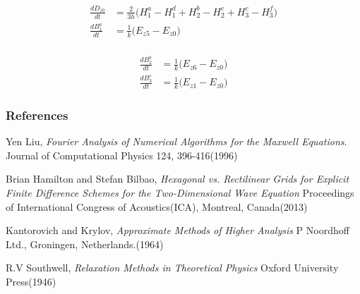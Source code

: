 \documentclass{beamer}
\begin{document}
\begin{frame}
\begin{minipage}{.5\textwidth}
  \centering
\begin{align*}
\frac{d D_{z0}}{dt} &= \frac{2}{3h} \big( H^a_1 - H^d_1 + H^b_2 - H^e_2 + H^c_3 - H^f_3 \big)\\
\frac{d B^a_1}{dt} &= \frac{1}{k} \big(E_{z5} - E_{z0} \big)\\
\end{align*}
\end{minipage}%
\begin{minipage}{.5\textwidth}
  \centering
\begin{align*}
\frac{d B^b_2}{dt}&= \frac{1}{k}\big( E_{z6} - E_{z0}\big)\\
\frac{d B^c_3}{dt}&= \frac{1}{k}\big( E_{z1} - E_{z0} \big)
\end{align*}
\end{minipage}

\end{frame}

\begin{frame}
\frametitle{References}


\begin{thebibliography}{9}
Yen Liu,
  \emph{Fourier Analysis of Numerical Algorithms for the Maxwell Equations}.
Journal of Computational Physics 124, 396-416(1996)

Brian Hamilton and Stefan Bilbao,
\emph{Hexagonal vs. Rectilinear Grids for Explicit Finite Difference Schemes for the Two-Dimensional Wave Equation}
Proceedings of International Congress of Acoustics(ICA), Montreal, Canada(2013)

Kantorovich and Krylov,
\emph{Approximate Methods of Higher Analysis} P Noordhoff Ltd., Groningen, Netherlands.(1964)

R.V Southwell, \emph{Relaxation Methods in Theoretical Physics} Oxford University Press(1946)

\end{thebibliography}


\end{frame}




\end{document}
